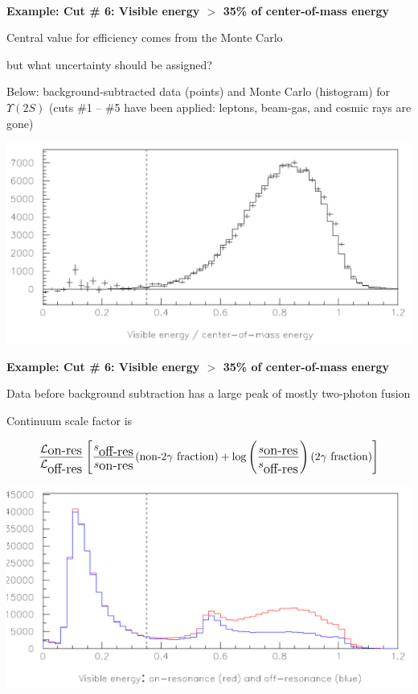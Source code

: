 \documentclass[landscape]{article}
\begin{document}
\vfill

\mbox{ }

\pagebreak

{\bf Example: Cut \# 6: Visible energy $>$ 35\% of center-of-mass energy}

\vfill

Central value for efficiency comes from the Monte Carlo

\begin{center} but what uncertainty should be assigned? \end{center}

\vfill

Below: background-subtracted data (points) and Monte Carlo (histogram)
for $\Upsilon(2S)$ (cuts \#1 -- \#5 have been applied: leptons,
beam-gas, and cosmic rays are gone)

\vfill

\includegraphics[width=\linewidth]{visen.pdf}

\pagebreak

{\bf Example: Cut \# 6: Visible energy $>$ 35\% of center-of-mass energy}

\vfill

Data before background subtraction has a large peak of mostly
two-photon fusion

\vfill

Continuum scale factor is

\vfill

\[
\frac{\mathcal{L}_{\mbox{\large on-res}}}{\mathcal{L}_{\mbox{\large off-res}}}
\left[\frac{s_{\mbox{\large off-res}}}{s_{\mbox{\large on-res}}} (\mbox{non-$2\gamma$ fraction}) +
\log\left(\frac{s_{\mbox{\large on-res}}}{s_{\mbox{\large off-res}}}\right) (\mbox{$2\gamma$ fraction})\right]
\]

\vfill

\includegraphics[width=\linewidth]{subtraction.pdf}
\end{document}
